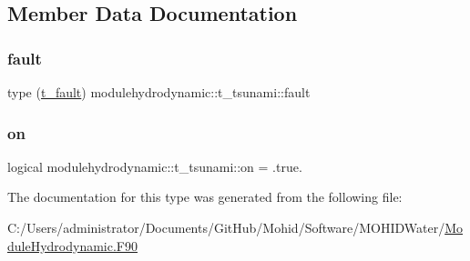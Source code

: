 \subsection{Member Data Documentation}
\mbox{\label{structmodulehydrodynamic_1_1t__tsunami_a304619e5a882ca7ff8da2eba5e91313b}} 
\subsubsection{\texorpdfstring{fault}{fault}}
{\footnotesize\ttfamily type (\mbox{\hyperlink{structmodulehydrodynamic_1_1t__fault}{t\+\_\+fault}}) modulehydrodynamic\+::t\+\_\+tsunami\+::fault\hspace{0.3cm}{\ttfamily [private]}}

\mbox{\label{structmodulehydrodynamic_1_1t__tsunami_a49d56df9231f3affed6303d2a0aa6972}} 
\subsubsection{\texorpdfstring{on}{on}}
{\footnotesize\ttfamily logical modulehydrodynamic\+::t\+\_\+tsunami\+::on = .true.\hspace{0.3cm}{\ttfamily [private]}}



The documentation for this type was generated from the following file\+:\begin{DoxyCompactItemize}
\item 
C\+:/\+Users/administrator/\+Documents/\+Git\+Hub/\+Mohid/\+Software/\+M\+O\+H\+I\+D\+Water/\mbox{\hyperlink{_module_hydrodynamic_8_f90}{Module\+Hydrodynamic.\+F90}}\end{DoxyCompactItemize}
